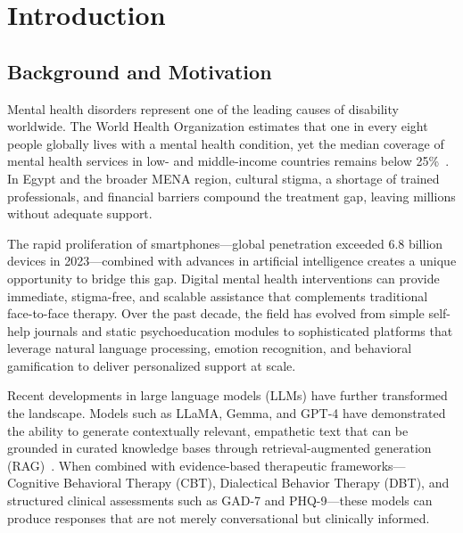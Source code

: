 \documentclass[12pt,a4paper,oneside,openany]{report}
\begin{document}
\tableofcontents
\newpage

\chapter{Introduction}
\label{ch:introduction}

\section{Background and Motivation}
\label{sec:bg}

Mental health disorders represent one of the leading causes of disability worldwide. The World Health Organization estimates that one in every eight people globally lives with a mental health condition, yet the median coverage of mental health services in low- and middle-income countries remains below 25\%~\cite{who2021mental}. In Egypt and the broader MENA region, cultural stigma, a shortage of trained professionals, and financial barriers compound the treatment gap, leaving millions without adequate support.

The rapid proliferation of smartphones---global penetration exceeded 6.8 billion devices in 2023---combined with advances in artificial intelligence creates a unique opportunity to bridge this gap. Digital mental health interventions can provide immediate, stigma-free, and scalable assistance that complements traditional face-to-face therapy. Over the past decade, the field has evolved from simple self-help journals and static psychoeducation modules to sophisticated platforms that leverage natural language processing, emotion recognition, and behavioral gamification to deliver personalized support at scale.

Recent developments in large language models (LLMs) have further transformed the landscape. Models such as LLaMA, Gemma, and GPT-4 have demonstrated the ability to generate contextually relevant, empathetic text that can be grounded in curated knowledge bases through retrieval-augmented generation (RAG)~\cite{lewis2020rag}. When combined with evidence-based therapeutic frameworks---Cognitive Behavioral Therapy (CBT), Dialectical Behavior Therapy (DBT), and structured clinical assessments such as GAD-7 and PHQ-9---these models can produce responses that are not merely conversational but clinically informed.
\end{document}
